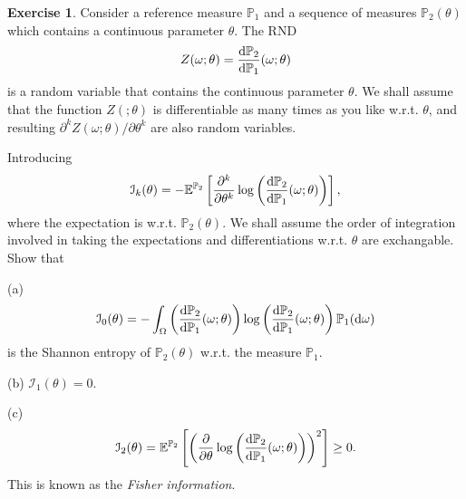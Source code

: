 \documentclass[12pt]{article}
\def\rd{{\rm d}}
\theoremstyle{definition}
\newtheorem{exer}{Exercise}
\theoremstyle{remark}
\begin{document}
\begin{exer}
	
	Consider a reference measure $\mathbb{P}_1$ and a
sequence of measures $\mathbb{P}_2(\theta)$ which contains a continuous parameter $\theta$.  The RND
\[
       Z(\omega;\theta) 
       = \frac{\rd\mathbb{P}_2}{\rd\mathbb{P}_1}(\omega;\theta)
\]
is a random variable that contains the continuous parameter 
$\theta$.  We shall assume that the function
$Z(;\theta)$ is differentiable as many times as you like
w.r.t. $\theta$, and resulting
$\partial^k Z(\omega;\theta)/\partial\theta^k$
are also random variables.
	
	Introducing
\[
   \mathcal{I}_k(\theta) = -\mathbb{E}^{\mathbb{P}_2}\left[\frac{\partial^k}{\partial\theta^k}\log\left(
       \frac{\rd\mathbb{P}_2}{\rd\mathbb{P}_1}(\omega;\theta)\right)\right],
\]
where the expectation is w.r.t. $\mathbb{P}_2(\theta)$.  We
shall assume the order of integration involved in taking the 
expectations and differentiations w.r.t. $\theta$
are exchangable.   Show that 

(a)
\[
           \mathcal{I}_0(\theta) = -\int_{\Omega}   
          \left( \frac{\rd\mathbb{P}_2}{\rd\mathbb{P}_1}(\omega;\theta)\right)
         \log\left(\frac{\rd\mathbb{P}_2}{\rd\mathbb{P}_1}
               (\omega;\theta)\right) \mathbb{P}_1 (\rd\omega)
\]
is the Shannon entropy of $\mathbb{P}_2(\theta)$ w.r.t. the
measure $\mathbb{P}_1$.  
   
(b) $\mathcal{I}_1(\theta) = 0$.

(c) 
\[
		\mathcal{I}_2(\theta) =  \mathbb{E}^{\mathbb{P}_2}\left[ \left(\frac{\partial }{
        \partial\theta}\log\left(\frac{\rd\mathbb{P}_2}{\rd\mathbb{P}_1}(\omega;\theta) \right) \right)^2 \right] \ge 0.
\]
This is known as the {\em Fisher information}.
\end{exer}
\end{document}
